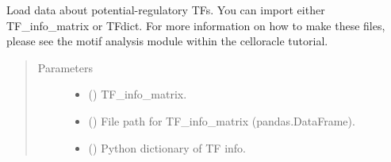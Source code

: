 \documentclass[letterpaper,10pt,english]{sphinxmanual}
\begin{document}
\begin{fulllineitems}
\begin{fulllineitems}
\begin{quote}
\begin{description}
\end{description}\end{quote}

\end{fulllineitems}


\begin{fulllineitems}
\label{\detokenize{modules/celloracle:celloracle.Oracle.import_TF_data}}
Load data about potential-regulatory TFs.
You can import either TF\_info\_matrix or TFdict.
For more information on how to make these files, please see the motif analysis module within the celloracle tutorial.
\begin{quote}\begin{description}
\item[{Parameters}] \leavevmode\begin{itemize}
\item {} 
 () \textendash{} TF\_info\_matrix.

\item {} 
 () \textendash{} File path for TF\_info\_matrix (pandas.DataFrame).

\item {} 
 () \textendash{} Python dictionary of TF info.

\end{itemize}

\end{description}\end{quote}

\end{fulllineitems}



\end{fulllineitems}
\end{document}
